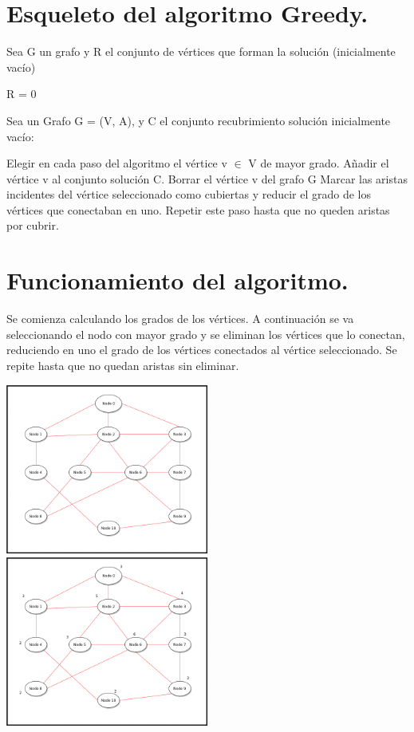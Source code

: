 \documentclass[a4paper, 11pt]{article}
\begin{document}
\section{Esqueleto del algoritmo Greedy.}

Sea G un grafo y R el conjunto de vértices que forman la solución (inicialmente vacío)

R = 0

Sea un Grafo G = (V, A), y C el conjunto recubrimiento solución inicialmente vacío:

Elegir en cada paso del algoritmo el vértice v $\in$ V de mayor grado.
Añadir el vértice v al conjunto solución C.
Borrar el vértice v del grafo G
Marcar las aristas incidentes del vértice seleccionado como cubiertas y reducir el grado de los vértices que conectaban en uno.
Repetir este paso hasta que no queden aristas por cubrir.

\section{Funcionamiento del algoritmo.}
Se comienza calculando los grados de los vértices. A continuación se va seleccionando el nodo con mayor grado y se eliminan los vértices que lo conectan, reduciendo en uno el grado de los vértices conectados al vértice seleccionado. Se repite hasta que no quedan aristas sin eliminar.

\includegraphics[width=0.5\textwidth]{gif-0.png}
\includegraphics[width=0.5\textwidth]{gif-1.png}
\end{document}
